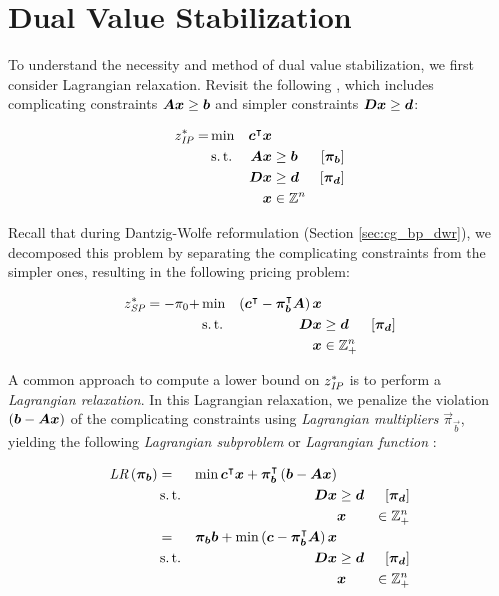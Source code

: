 \section{Dual Value Stabilization}\label{sec:cg_bp_dvs}
To understand the necessity and method of dual value stabilization, we first consider Lagrangian relaxation. Revisit the following \IP{}, which includes complicating constraints ${\bm{A}} {\bm{x}} \geq {\bm{b}}$ and simpler constraints ${\bm{D}} {\bm{x}} \geq {\bm{d}}$:

\begin{equation*}
\begin{aligned}
z^*_{\textit{IP}}{} = &\min & {\bm{c}}^\intercal {\bm{x}} & & & \\
&\operatorname{s.t.} & {\bm{A}} {\bm{x}} & \geq {\bm{b}} & \left[{\bm{\pi}}_{\bm{b}}\right] & \\
&& {\bm{D}} {\bm{x}} & \geq {\bm{d}} & \left[{\bm{\pi}}_{\bm{d}}\right] & \\
&& {\bm{x}} & \in \mathbb{Z}^n
\end{aligned}
\end{equation*}

Recall that during Dantzig-Wolfe reformulation (Section \ref{sec:cg_bp_dwr}), we decomposed this problem by separating the complicating constraints from the simpler ones, resulting in the following pricing problem:

\begin{equation*}
\begin{aligned}
z^*_\SP{} = -\pi_0 + &\min & \left( \vec{c}\transpose - \vec{\pi}_\vec{b}\transpose \mat{A} \right) \vec{x} & & \\
&\st & \mat{D} \vec{x} & \geq \vec{d} & \left[\vec{\pi}_\vec{d}\right] \\
&& \vec{x} & \in \mathbb{Z}_+^n
\end{aligned}
\end{equation*}

A common approach to compute a lower bound on $z^*_{\textit{IP}}{}$ is to perform a \textit{Lagrangian relaxation}. In this Lagrangian relaxation, we penalize the violation $({\bm{b}} - {\bm{A}} {\bm{x}})$ of the complicating constraints using \textit{Lagrangian multipliers} $\vec{\pi}_\vec{b}$, yielding the following \textit{Lagrangian subproblem} or \textit{Lagrangian function} \cite{thebook}:

\begin{equation*}
\begin{aligned}
\LR{\vec{\pi}_\vec{b}} &= & \min \vec{c}\transpose \vec{x} + \vec{\pi}_\vec{b}\transpose \left( \vec{b} - \mat{A}\vec{x} \right) & & \\
& \st & \mat{D} \vec{x} & \geq \vec{d} & \left[\vec{\pi}_\vec{d}\right] \\
&&& \vec{x} & \in \mathbb{Z}_+^n \\
&= & \vec{\pi}_\vec{b} \vec{b} + \min \left( \vec{c} - \vec{\pi}_\vec{b}\transpose \mat{A} \right) \vec{x} & & \\
& \st & \mat{D} \vec{x} & \geq \vec{d} & \left[\vec{\pi}_\vec{d}\right] \\
&&& \vec{x} & \in \mathbb{Z}_+^n
\end{aligned}
\end{equation*}

